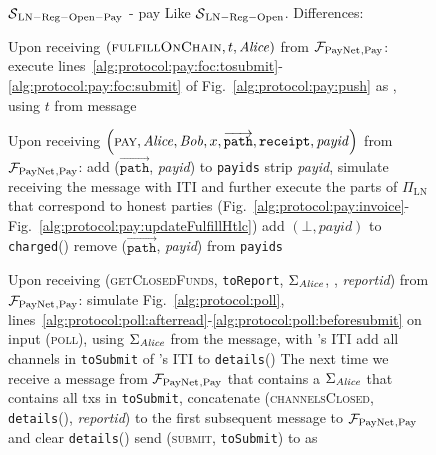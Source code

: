 \begin{figure}[H]
  \begin{simulatorbox}{$\mathcal{S}{}_{\mathrm{LN - Reg - Open - Pay}}$ - pay}
    Like $\mathcal{S}{}_{\mathrm{LN - Reg - Open}}$. Differences:
    \begin{algorithmic}[1]
      \State Upon receiving $\left(\textsc{fulfillOnChain}, t, \mathit{Alice}\right)$
      from $\mathcal{F}_{\mathrm{PayNet}}{}_{\mathrm{, Pay}}$:
      \label{alg:sim:pay:foc:top}
      \Indent
        \State execute
        lines~\ref{alg:protocol:pay:foc:tosubmit}-\ref{alg:protocol:pay:foc:submit}
        of Fig.~\ref{alg:protocol:pay:push} as \alice{}, using $t$ from message
        \label{alg:sim:pay:foc:run}
      \EndIndent
      \Statex

      \State Upon receiving $\left(\textsc{pay}, \mathit{Alice}, \mathit{Bob}, x,
      \overrightarrow{\mathtt{path}}, \mathtt{receipt}, \mathit{payid}\right)$
      from $\mathcal{F}_{\mathrm{PayNet}}{}_{\mathrm{, Pay}}$:
      \Indent
        \State add ($\overrightarrow{\mathtt{path}}$, \textit{payid}) to
        \texttt{payids}
        \State strip \textit{payid}, simulate receiving the message with
        \alice{} ITI and further execute the parts of $\Pi_{\mathrm{LN}}$ that
        correspond to honest parties (Fig.~\ref{alg:protocol:pay:invoice}-
        Fig.~\ref{alg:protocol:pay:updateFulfillHtlc})
        \label{alg:sim:pay:simulate}
         
          \State add $\left(\bot, \mathit{payid}\right)$ to
          \texttt{charged}(\alice)
          \State remove ($\overrightarrow{\mathtt{path}}$, \textit{payid}) from
          \texttt{payids}
        \EndIf
      \EndIndent
      \Statex

      \State Upon receiving (\textsc{getClosedFunds}, \texttt{toReport},
      $\Sigma_{\mathit{Alice}}$, \alice, \textit{reportid}) from $\mathcal{F}_{\mathrm{PayNet}}{}_{\mathrm{,
      Pay}}$:
      \Indent
        \State simulate Fig.~\ref{alg:protocol:poll},
        lines~\ref{alg:protocol:poll:afterread}-\ref{alg:protocol:poll:beforesubmit}
        on input (\textsc{poll}), using $\Sigma_{\mathit{Alice}}$ from the message, with
        \alice's ITI
        \label{alg:sim:poll:run}
        \State add all channels in \texttt{toSubmit} of \alice's ITI to
        \texttt{details}(\alice)
        \label{alg:sim:poll:save}
        \State The next time we receive a message from $\mathcal{F}_{\mathrm{PayNet}}{}_{\mathrm{,
        Pay}}$ that contains a $\Sigma_{\mathit{Alice}}$ that contains all txs in
        \texttt{toSubmit}, concatenate (\textsc{channelsClosed},
        \texttt{details}(\alice), \textit{reportid}) to the first subsequent
        message to $\mathcal{F}_{\mathrm{PayNet}}{}_{\mathrm{, Pay}}$ and clear
        \texttt{details}(\alice)
        \label{alg:sim:poll:inform}
        \State send (\textsc{submit}, \texttt{toSubmit}) to \ledger{} as \alice
        \label{alg:sim:poll:submit}
      \EndIndent
    \end{algorithmic}
  \end{simulatorbox}
  \caption{}
  \label{alg:sim:pay}
\end{figure}

